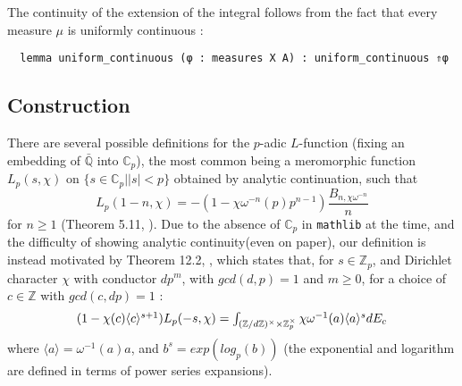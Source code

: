 \documentclass[a4paper,UKenglish,cleveref, autoref, thm-restate]{lipics-v2021}
\newcommand{\lean}[1]{\texttt{#1}\xspace} %
\begin{document}
The continuity of the extension of the integral follows from the fact that every measure $\mu$ is uniformly continuous : 
\begin{lstlisting}
  lemma uniform_continuous (φ : measures X A) : uniform_continuous ⇑φ 
\end{lstlisting}

\subsection{Construction}
There are several possible definitions for the $p$-adic $L$-function (fixing an embedding of
$\mathbb{\bar{\mathbb{Q}}}$ into $\mathbb{C}_p$), the most common being a meromorphic function $L_p(s, \chi)$ on
\newline $\{ s \in \mathbb{C}_p | |s| < p \}$ obtained by analytic continuation, such that
$$ L_p (1 - n, \chi) = -(1 - \chi \omega^{-n}(p)p^{n - 1}) \frac{B_{n, \chi \omega^{-n}}}{n} $$
for $n \ge 1$ (Theorem 5.11, \cite{cyc}). Due to the absence of $\mathbb{C}_p$ in \lean{mathlib} at the time, 
and the difficulty of showing analytic continuity(even on paper), our definition is instead motivated by Theorem 12.2, \cite{cyc}, 
which states that, for $s \in \mathbb{Z}_p$, and Dirichlet character $\chi$ with
conductor $d p^m$, with $gcd (d, p) = 1$ and $m \ge 0$, for a choice of $c \in \mathbb{Z}$
with $gcd (c, dp) = 1$ :
\begin{equation}\label{eqn:2}
  $$ (1 - \chi(c) \langle c \rangle ^{s+1}) L_p(-s, \chi) = \int_{(\mathbb{Z}/d \mathbb{Z})^{\times} \times \mathbb{Z}_p^{\times}}
\chi \omega^{-1}(a) \langle a \rangle ^s dE_c $$
\end{equation}
where $\langle a \rangle  = \omega^{-1}(a) a$, and $b^s = exp (log_p (b))$ (the exponential and logarithm are defined in 
terms of power series expansions).
\end{document}
